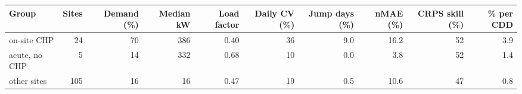 \begin{tabular}{lrrrrrrrrr}
\toprule
Group & Sites & Demand (\%) & Median kW & Load factor & Daily CV (\%) & Jump days (\%) & nMAE (\%) & CRPS skill (\%) & \% per CDD \\
\midrule
on-site CHP & 24 & 70 & 386 & 0.40 & 36 & 9.0 & 16.2 & 52 & 3.9 \\
acute, no CHP & 5 & 14 & 332 & 0.68 & 10 & 0.0 & 3.8 & 52 & 1.4 \\
other sites & 105 & 16 & 16 & 0.47 & 19 & 0.5 & 10.6 & 47 & 0.8 \\
\bottomrule
\end{tabular}
